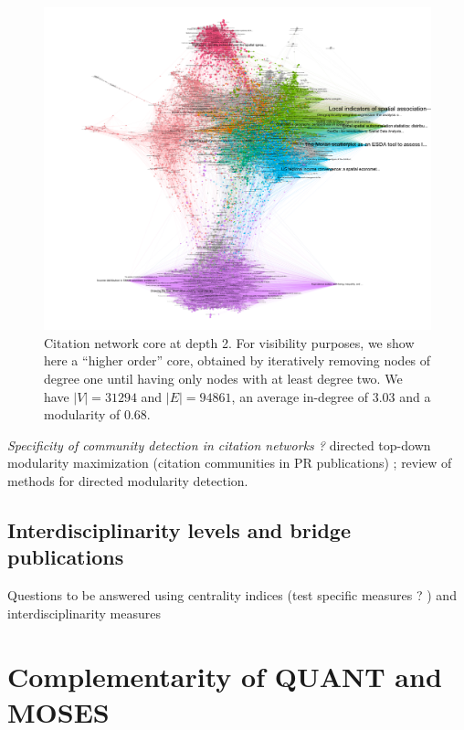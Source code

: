 \begin{figure}
  \includegraphics[width=\linewidth]{figures/microsim_depth2_corehigher.png}
  \caption{Citation network core at depth 2. For visibility purposes, we show here a ``higher order'' core, obtained by iteratively removing nodes of degree one until having only nodes with at least degree two. We have $\left|V\right|=31294$ and $\left|E\right|=94861$, an average in-degree of 3.03 and a modularity of 0.68.}
  \label{fig:citnwdepth2}
\end{figure}


\textit{Specificity of community detection in citation networks ? } \cite{chen2010community} directed top-down modularity maximization (citation communities in PR publications) ; \cite{malliaros2013clustering} review of methods for directed modularity detection.

\subsection{Interdisciplinarity levels and bridge publications}

Questions to be answered using centrality indices (test specific measures ? \cite{latora2007measure}) and interdisciplinarity measures \cite{leydesdorff2011indicators}


\section{Complementarity of QUANT and MOSES}

